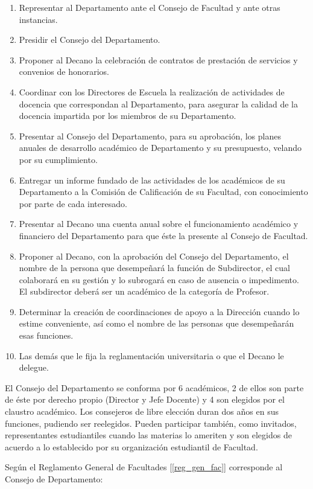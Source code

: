 \begin{enumerate}
\item Representar al Departamento ante el Consejo de Facultad y ante otras instancias.
\item Presidir el Consejo del Departamento.
\item Proponer al Decano la celebración de contratos de prestación de servicios y convenios de
honorarios.
\item Coordinar con los Directores de Escuela la realización de actividades de docencia que
correspondan al Departamento, para asegurar la calidad de la docencia impartida por los
miembros de su Departamento.
\item Presentar al Consejo del Departamento, para su aprobación, los planes anuales de desarrollo
académico de Departamento y su presupuesto, velando por su cumplimiento.
\item Entregar un informe fundado de las actividades de los académicos de su Departamento a la
Comisión de Calificación de su Facultad, con conocimiento por parte de cada interesado.
\item Presentar al Decano una cuenta anual sobre el funcionamiento académico y financiero del
Departamento para que éste la presente al Consejo de Facultad.
\item Proponer al Decano, con la aprobación del Consejo del Departamento, el nombre de la persona
que desempeñará la función de Subdirector, el cual colaborará en su gestión y lo subrogará en
caso de ausencia o impedimento. El subdirector deberá ser un académico de la categoría de
Profesor.
\item Determinar la creación de coordinaciones de apoyo a la Dirección cuando lo estime conveniente,
así como el nombre de las personas que desempeñarán esas funciones.
\item Las demás que le fija la reglamentación universitaria o que el Decano le delegue.
\end{enumerate}

El Consejo del Departamento se conforma por 6 académicos, 2 de ellos son parte de éste
por derecho propio (Director y Jefe Docente) y 4 son elegidos por el claustro académico. Los
consejeros de libre elección duran dos años en sus funciones, pudiendo ser reelegidos. Pueden
participar también, como invitados, representantes estudiantiles cuando las materias lo ameriten y
son elegidos de acuerdo a lo establecido por su organización estudiantil de Facultad.

Según el Reglamento General de Facultades [\ref{reg_gen_fac}] corresponde al Consejo de Departamento:

